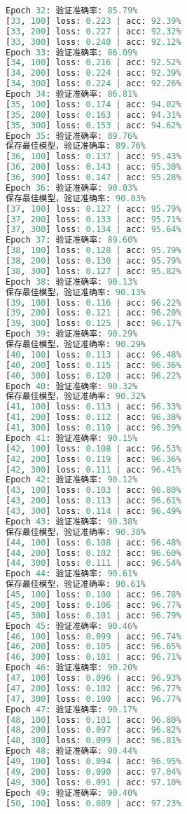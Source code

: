 \documentclass[UTF8]{report}
\theoremstyle{MyLineTheoremStyle} %
\theoremstyle{MyBlockTheoremStyle} %
\theoremstyle{MySubsubsectionStyle} %
\begin{document}
\begin{lstlisting}[language=python, caption={CNN训练结果一}, label={lst:cnn_train_result}]
Epoch 32: 验证准确率: 85.79%
[33, 100] loss: 0.223 | acc: 92.39%
[33, 200] loss: 0.227 | acc: 92.32%
[33, 300] loss: 0.240 | acc: 92.12%
Epoch 33: 验证准确率: 86.09%
[34, 100] loss: 0.216 | acc: 92.52%
[34, 200] loss: 0.224 | acc: 92.39%
[34, 300] loss: 0.224 | acc: 92.26%
Epoch 34: 验证准确率: 86.81%
[35, 100] loss: 0.174 | acc: 94.02%
[35, 200] loss: 0.163 | acc: 94.31%
[35, 300] loss: 0.153 | acc: 94.62%
Epoch 35: 验证准确率: 89.76%
保存最佳模型，验证准确率: 89.76%
[36, 100] loss: 0.137 | acc: 95.43%
[36, 200] loss: 0.143 | acc: 95.30%
[36, 300] loss: 0.147 | acc: 95.28%
Epoch 36: 验证准确率: 90.03%
保存最佳模型，验证准确率: 90.03%
[37, 100] loss: 0.127 | acc: 95.79%
[37, 200] loss: 0.133 | acc: 95.71%
[37, 300] loss: 0.134 | acc: 95.64%
Epoch 37: 验证准确率: 89.60%
[38, 100] loss: 0.128 | acc: 95.79%
[38, 200] loss: 0.130 | acc: 95.79%
[38, 300] loss: 0.127 | acc: 95.82%
Epoch 38: 验证准确率: 90.13%
保存最佳模型，验证准确率: 90.13%
[39, 100] loss: 0.116 | acc: 96.22%
[39, 200] loss: 0.121 | acc: 96.20%
[39, 300] loss: 0.125 | acc: 96.17%
Epoch 39: 验证准确率: 90.29%
保存最佳模型，验证准确率: 90.29%
[40, 100] loss: 0.113 | acc: 96.48%
[40, 200] loss: 0.115 | acc: 96.36%
[40, 300] loss: 0.120 | acc: 96.22%
Epoch 40: 验证准确率: 90.32%
保存最佳模型，验证准确率: 90.32%
[41, 100] loss: 0.113 | acc: 96.33%
[41, 200] loss: 0.112 | acc: 96.38%
[41, 300] loss: 0.110 | acc: 96.39%
Epoch 41: 验证准确率: 90.15%
[42, 100] loss: 0.108 | acc: 96.53%
[42, 200] loss: 0.119 | acc: 96.36%
[42, 300] loss: 0.111 | acc: 96.41%
Epoch 42: 验证准确率: 90.12%
[43, 100] loss: 0.103 | acc: 96.80%
[43, 200] loss: 0.113 | acc: 96.61%
[43, 300] loss: 0.114 | acc: 96.49%
Epoch 43: 验证准确率: 90.38%
保存最佳模型，验证准确率: 90.38%
[44, 100] loss: 0.108 | acc: 96.48%
[44, 200] loss: 0.102 | acc: 96.60%
[44, 300] loss: 0.111 | acc: 96.54%
Epoch 44: 验证准确率: 90.61%
保存最佳模型，验证准确率: 90.61%
[45, 100] loss: 0.100 | acc: 96.78%
[45, 200] loss: 0.106 | acc: 96.77%
[45, 300] loss: 0.101 | acc: 96.79%
Epoch 45: 验证准确率: 90.46%
[46, 100] loss: 0.099 | acc: 96.74%
[46, 200] loss: 0.105 | acc: 96.65%
[46, 300] loss: 0.101 | acc: 96.71%
Epoch 46: 验证准确率: 90.20%
[47, 100] loss: 0.096 | acc: 96.93%
[47, 200] loss: 0.102 | acc: 96.77%
[47, 300] loss: 0.100 | acc: 96.77%
Epoch 47: 验证准确率: 90.17%
[48, 100] loss: 0.101 | acc: 96.80%
[48, 200] loss: 0.097 | acc: 96.82%
[48, 300] loss: 0.099 | acc: 96.81%
Epoch 48: 验证准确率: 90.44%
[49, 100] loss: 0.094 | acc: 96.95%
[49, 200] loss: 0.090 | acc: 97.04%
[49, 300] loss: 0.091 | acc: 97.10%
Epoch 49: 验证准确率: 90.40%
[50, 100] loss: 0.089 | acc: 97.23%

\end{lstlisting}
\end{document}
